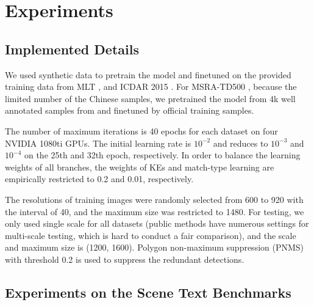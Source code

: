 \documentclass{article}
\begin{document}
\section{Experiments}

\subsection{Implemented Details}
We used synthetic data \cite{Gupta2016Synthetic} to pretrain the model and finetuned on the provided training data from MLT \cite{nayef2017icdar2017}, and ICDAR 2015 \cite{karatzas2015icdar}. For MSRA-TD500 \cite{Yao2012Detecting}, because the limited number of the Chinese samples, we pretrained the model from 4k well annotated samples from \cite{Shi2017ICDAR2017} and finetuned by official training samples. 

The number of maximum iterations is 40 epochs for each dataset on four NVIDIA 1080ti GPUs. The initial learning rate is $10^{-2}$ and reduces to $10^{-3}$ and $10^{-4}$ on the 25th and 32th epoch, respectively. In order to balance the learning weights of all branches, the weights of KEs and match-type learning are empirically restricted to 0.2 and 0.01, respectively.

The resolutions of training images were randomly selected from 600 to 920 with the interval of 40, and the maximum size was restricted to 1480.
For testing, we only used single scale for all datasets (public methods have numerous settings for multi-scale testing, which is hard to conduct a fair comparison), and the scale and maximum size is (1200, 1600). Polygon non-maximum suppression (PNMS) \cite{yuliang2017detecting} with threshold 0.2 is used to suppress the redundant detections.

\subsection{Experiments on the Scene Text Benchmarks}
\end{document}
